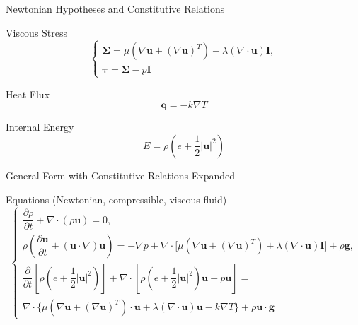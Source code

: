 \begin{secframe}
\small
\textcolor{red_unipd}{\Large Newtonian Hypotheses and Constitutive Relations}

\begin{alertblock}{Viscous Stress}
\[
\begin{cases}
\boldsymbol{\Sigma} = \mu\left(\nabla \mathbf{u} + (\nabla \mathbf{u})^T\right) + \lambda (\nabla\!\cdot\!\mathbf{u}) \mathbf{I},\\[4pt]
\boldsymbol{\tau} = \boldsymbol{\Sigma} - p \mathbf{I}
\end{cases}
\]
\end{alertblock}

\begin{alertblock}{Heat Flux}
\[
\mathbf{q} = -k \nabla T
\]
\end{alertblock}

\begin{alertblock}{Internal Energy}
\[
E = \rho\left(e + \dfrac{1}{2}|\mathbf{u}|^2\right)
\]
\end{alertblock}

\end{secframe}




\begin{secframe}
\small
\textcolor{red_unipd}{\Large General Form with Constitutive Relations Expanded}

\vspace{0.6em}

\begin{alertblock}{Equations (Newtonian, compressible, viscous fluid)}
\[
\begin{cases}
\dfrac{\partial \rho}{\partial t}
+ \nabla\!\cdot\!(\rho \mathbf{u}) = 0,\\[16pt]

\rho\!\left(
\dfrac{\partial \mathbf{u}}{\partial t}
+ (\mathbf{u}\!\cdot\!\nabla)\mathbf{u}
\right)
= -\nabla p
+ \nabla\!\cdot\!\Big[
\mu\!\left(\nabla \mathbf{u} + (\nabla \mathbf{u})^T\right)
+ \lambda (\nabla\!\cdot\!\mathbf{u})\mathbf{I}
\Big]
+ \rho \mathbf{g},\\[20pt]

\dfrac{\partial }{\partial t}\!
\left[\rho\!\left(e + \dfrac{1}{2}|\mathbf{u}|^2\right)\right]
+ \nabla\!\cdot\!
\left[\rho\!\left(e + \dfrac{1}{2}|\mathbf{u}|^2\right)\mathbf{u} + p\mathbf{u}\right]
= \\ \nabla\!\cdot\!
\Big\{
\mu\!\left(\nabla \mathbf{u} + (\nabla \mathbf{u})^T\right)\!\cdot\!\mathbf{u}
+ \lambda (\nabla\!\cdot\!\mathbf{u})\mathbf{u}
- k\nabla T
\Big\}
+ \rho \mathbf{u}\!\cdot\!\mathbf{g}
\end{cases}
\]
\end{alertblock}

\end{secframe}




